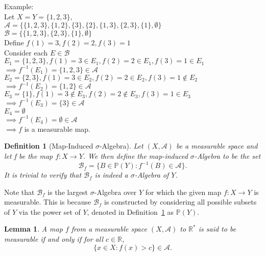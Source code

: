 \documentclass[10pt, oneside]{article}
\newcommand{\R}{\mathbb{R}}
\newtheorem{defn}{Definition}
\newtheorem{lem}{Lemma}
\begin{document}
Example:\\ Let $X=Y=\{1,2,3\}$, \\$\mathcal{A}=\{\{1,2,3\},\{1,2\},\{3\},\{2\},\{1,3\},\{2,3\},\{1\},\emptyset\}$ \\ $\mathcal{B}=\{\{1,2,3\},\{2,3\},\{1\},\emptyset\}$ \\

Define $f(1)=3,f(2)=2,f(3)=1$\\
Consider each $E\in \mathcal{B}$ \\
$E_1=\{1,2,3\},f(1)=3\in E_1,f(2)=2\in E_1,f(3)=1\in E_1$\\ $\implies f^{-1}(E_1)=\{1,2,3\}\in \mathcal{A}$ \checkmark\\

$E_2=\{2,3\},f(1)=3\in E_2,f(2)=2\in E_2,f(3)=1\notin E_2$\\ $\implies f^{-1}(E_2)=\{1,2\}\in \mathcal{A}$ \checkmark\\

$E_3=\{1\},f(1)=3\notin E_3,f(2)=2\notin E_3, f(3)=1\in E_3$\\ $\implies f^{-1}(E_3)=\{3\}\in \mathcal{A}$ \checkmark\\

$E_4=\emptyset$\\ $\implies f^{-1}(E_4)=\emptyset\in \mathcal{A}$ \checkmark\\

$\implies f$ is a measurable map. 

\begin{defn}[Map-Induced $\sigma$-Algebra]
    \label{defn:map-ind-SA}
    Let $(X,\mathcal{A})$ be a measurable space and let f be the map $f \colon X 
    \to Y$. We then define the map-induced $\sigma$-Algebra to be the set 
    \[\mathcal{B}_f = \{B \in \mathbb{P}(Y) \colon f^{-1}(B) \in \mathcal{A}\}. \]
    It is trivial to verify that $\mathcal{B}_f$ is indeed a $\sigma$-Algebra of $Y$. 
\end{defn}

Note that $\mathcal{B}_f$ is the largest $\sigma$-Algebra over $Y$ for which the 
given map $f \colon X \to Y$ is measurable. This is because $\mathcal{B}_f$ is 
constructed by considering all possible subsets of $Y$ via the power set of $Y$, 
denoted in Definition~\ref{defn:map-ind-SA} as $\mathbb{P}(Y)$. 

\begin{lem}
    A map $f$ from a measurable space $(X,\mathcal{A})$ to $\R^{*}$ is said to be 
    measurable if and only if for all $c \in \R$, 
    \[\{x \in X \colon f(x) > c\} \in \mathcal{A}. \]
\end{lem}
\end{document}
